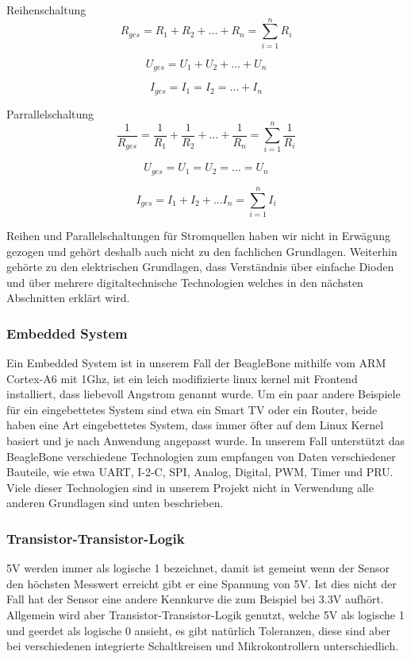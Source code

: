 Reihenschaltung
\[
R_{ges} = R_1 + R_2 + ... + R_n = \sum_{i=1}^{n} R_i
\]

\[
U_{ges} = U_1 + U_2 + ... + U_n
\]

\[
I_{ges} = I_1 = I_2 = ... + I_n
\]

Parrallelschaltung
\[
\frac{1}{R_{ges}} = \frac{1}{R_1} + \frac{1}{R_2} + ... + \frac{1}{R_n} = \sum_{i=1}^{n} \frac{1}{R_i}
\]

\[
U_{ges} = U_1 = U_2 = ... = U_n
\]

\[
I_{ges} = I_1 + I_2 + ... I_n = \sum_{i=1}^{n} I_i
\]

Reihen und Parallelschaltungen für Stromquellen haben wir nicht in Erwägung gezogen und gehört deshalb auch nicht zu den fachlichen Grundlagen. Weiterhin gehörte zu den elektrischen Grundlagen, dass Verständnis über einfache Dioden und über mehrere digitaltechnische Technologien welches in den nächsten Abschnitten erklärt wird.

\subsubsection{Embedded System}
Ein Embedded System ist in unserem Fall der BeagleBone mithilfe vom ARM Cortex-A6 mit 1Ghz, ist ein leich modifizierte linux kernel mit Frontend installiert, dass liebevoll Angstrom genannt wurde. Um ein paar andere Beispiele für ein eingebettetes System sind etwa ein Smart TV oder ein Router, beide haben eine Art eingebettetes System, dass immer öfter auf dem Linux Kernel basiert und je nach Anwendung angepasst wurde. In unserem Fall unterstützt das BeagleBone verschiedene Technologien zum empfangen von Daten verschiedener Bauteile, wie etwa UART, I-2-C, SPI, Analog, Digital, PWM, Timer und PRU. Viele dieser Technologien sind in unserem Projekt nicht in Verwendung alle anderen Grundlagen sind unten beschrieben.

\subsubsection{Transistor-Transistor-Logik}
5V werden immer als logische 1 bezeichnet, damit ist gemeint wenn der Sensor den höchsten Messwert erreicht gibt er eine Spannung von 5V. Ist dies nicht der Fall hat der Sensor eine andere Kennkurve die zum Beispiel bei 3.3V aufhört. Allgemein wird aber Transistor-Transistor-Logik genutzt, welche 5V als logische 1 und geerdet als logische 0 ansieht, es gibt natürlich Toleranzen, diese sind aber bei verschiedenen integrierte Schaltkreisen und Mikrokontrollern unterschiedlich.

